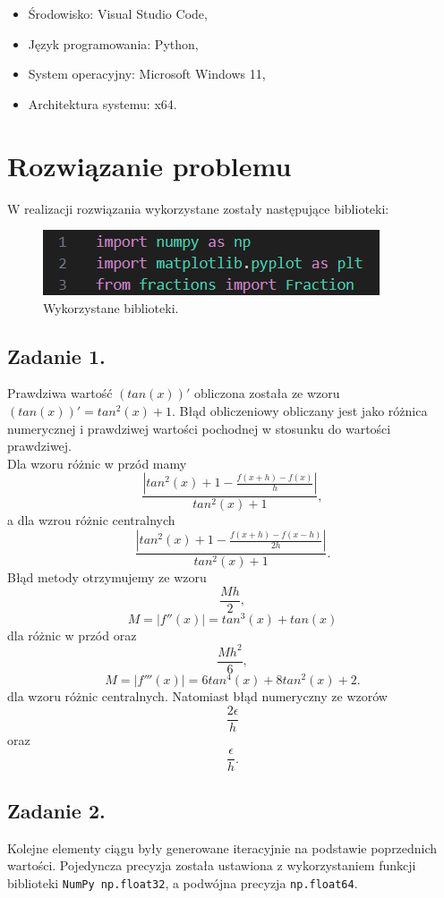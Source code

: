 \documentclass[11pt]{scrartcl}
\begin{document}
    \begin{itemize}
        \item Środowisko: Visual Studio Code,
        \item Język programowania: Python,
        \item System operacyjny: Microsoft Windows 11,
        \item Architektura systemu: x64.
    \end{itemize}
    
    \section{Rozwiązanie problemu}
    W realizacji rozwiązania wykorzystane zostały następujące biblioteki:
    \begin{figure}[H]
        \includegraphics[width=0.6\linewidth]{libs.png}
        \caption{Wykorzystane biblioteki.}
    \end{figure}

    \subsection{Zadanie 1.}
    Prawdziwa wartość $(tan(x))'$ obliczona została ze wzoru
    $(tan(x))'=tan^2(x)+1$. Błąd obliczeniowy obliczany jest jako różnica
    numerycznej i prawdziwej wartości pochodnej w stosunku do wartości
    prawdziwej. \\
    Dla wzoru różnic w przód mamy
    \[
        \frac{\left| tan^2(x)+1 - \frac{f(x+h) - f(x)}{h} \right|}{tan^2(x)+1},
    \]
    a dla wzrou różnic centralnych
    \[
        \frac{\left| tan^2(x)+1 - \frac{f(x+h) - f(x-h)}{2h} \right|}
        {tan^2(x)+1}.
    \]
    Błąd metody otrzymujemy ze wzoru
    \[
        \frac{Mh}{2},
    \]
    \[
        M=\left|f''(x)\right|=tan^3(x)+tan(x)
    \]
    dla różnic w przód oraz
    \[
        \frac{Mh^2}{6},
    \]
    \[
        M=\left|f'''(x)\right|=6tan^4(x)+8tan^2(x)+2.
    \]
    dla wzoru różnic centralnych. Natomiast błąd numeryczny ze wzorów
    \[
        \frac{2\epsilon}{h}
    \]
    oraz
    \[
        \frac{\epsilon}{h}.
    \]

    \subsection{Zadanie 2.}
    Kolejne elementy ciągu były generowane iteracyjnie na podstawie poprzednich
    wartości. Pojedyncza precyzja została ustawiona z wykorzystaniem funkcji
    biblioteki \texttt{NumPy np.float32}, a podwójna precyzja
    \texttt{np.float64}.
\end{document}
